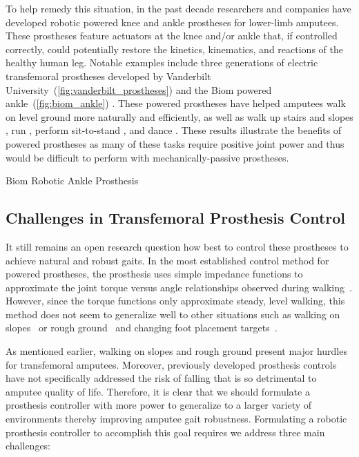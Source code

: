 To help remedy this situation, in the past decade researchers and companies have
developed robotic powered knee and ankle prostheses for lower-limb amputees.
These prostheses feature actuators at the knee and/or ankle that, if controlled
correctly, could potentially restore the kinetics, kinematics, and reactions
of the healthy human leg. Notable examples include three generations of
electric transfemoral prostheses developed by Vanderbilt
University~(\cref{fig:vanderbilt_prostheses}) \citep{sup2009preliminary,
lawson2013control, lawson2014robotic} and the Biom powered
ankle~(\cref{fig:biom_ankle}) \citep{herr2012bionic}. These powered prostheses
have helped amputees walk on level ground more naturally and efficiently, as
well as walk up stairs and slopes \citep{sup2011upslope, lawson2013control}, run
\citep{huff2012running, shultz2015running}, perform sit-to-stand
\citep{varol2009powered}, and dance \citep{rouse2015design}. These results
illustrate the benefits of powered prostheses as many of these tasks require
positive joint power and thus would be difficult to perform with
mechanically-passive prostheses.

\begin{marginfigure}[-1in]
    \centering
    \caption{Biom Robotic Ankle Prosthesis}
    \label{fig:biom_ankle}
\end{marginfigure}


\subsection{Challenges in Transfemoral Prosthesis Control}\label{sec:challenges}
It still remains an open research question how best to control these prostheses
to achieve natural and robust gaits. In the most established control method for
powered prostheses, the prosthesis uses simple impedance functions to
approximate the joint torque versus angle relationships observed during
walking~\citep{sup2009preliminary}. However, since the torque functions only
approximate steady, level walking, this method does not seem to generalize well
to other situations such as walking on slopes~\citep{sup2011upslope} or rough
ground~\citep{thatte2016toward} and changing foot placement
targets~\citep{schepelmann2016evaluation}. 

As mentioned earlier, walking on slopes and rough ground present major hurdles
for transfemoral amputees. Moreover, previously developed prosthesis controls
have not specifically addressed the risk of falling that is so detrimental to
amputee quality of life. Therefore, it is clear that we should formulate a
prosthesis controller with more power to generalize to a larger variety of
environments thereby improving amputee gait robustness. Formulating a robotic
prosthesis controller to accomplish this goal requires we address three main
challenges:

